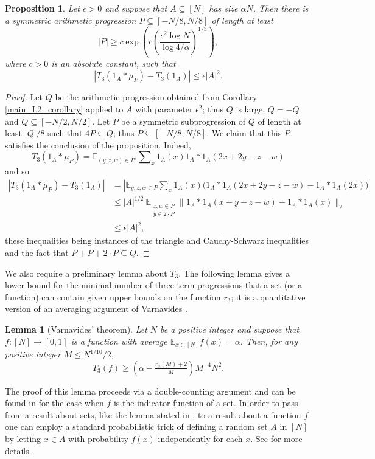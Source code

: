 \documentclass[12pt,a4paper,reqno]{amsart}
\numberwithin{equation}{section}
\theoremstyle{plain}
\newtheorem{proposition}[theorem]{Proposition}
\newtheorem{lemma}[theorem]{Lemma}
\theoremstyle{definition}
\renewcommand{\leq}{\leqslant}
\renewcommand{\geq}{\geqslant}
\renewcommand{\subset}{\subseteq}
\def\E{\mathbb{E}}
\DeclareMathOperator{\ssum}{\textstyle{\sum\nolimits}}
\providecommand{\norm}[1]{\lVert#1\rVert}
\begin{document}
\begin{proposition}\label{T3-approximation}
Let $\epsilon > 0$ and suppose that $A \subset [N]$ has size $\alpha N$. Then there is a symmetric arithmetic progression $P \subset [-N/8,N/8]$ of length at least 
\[ |P| \geq c \exp\left( c \left( \frac{\epsilon^2\log{N}}{\log{4/\alpha}} \right)^{1/3} \right), \]
where $c > 0$ is an absolute constant, such that
\[ | T_3(1_A * \mu_P) - T_3(1_A) | \leq \epsilon |A|^2. \]
\end{proposition}
\begin{proof}
Let $Q$ be the arithmetic progression obtained from Corollary \ref{main_L2_corollary} applied to $A$ with parameter $\epsilon^2$; thus $Q$ is large, $Q = -Q$ and $Q \subset [-N/2,N/2]$. Let $P$ be a symmetric subprogression of $Q$ of length at least $|Q|/8$ such that $4P \subset Q$; thus $P \subset [-N/8,N/8]$. We claim that this $P$ satisfies the conclusion of the proposition. Indeed,
\[ T_3(1_A*\mu_P) = \E_{(y,z,w) \in P^3} \ssum_x 1_A(x) 1_A*1_A(2x+2y-z-w) \]
and so 
\begin{align*}
| T_3(1_A*\mu_P) - T_3(1_A) | &= \left| \E_{y,z,w \in P} \ssum_x 1_A(x) \big( 1_A*1_A(2x+2y-z-w) - 1_A*1_A(2x) \big) \right| \\
&\leq |A|^{1/2}\ \E_{\substack{z,w \in P \\ y \in 2\cdot P}} \norm{1_A*1_A(x -y-z-w) - 1_A*1_A(x)}_2 \\
&\leq \epsilon |A|^2,
\end{align*}
these inequalities being instances of the triangle and Cauchy-Schwarz inequalities and the fact that $P+P+2\cdot P \subset Q$.
\end{proof}

We also require a preliminary lemma about $T_3$. The following lemma gives a lower bound for the minimal number of three-term progressions that a set (or a function) can contain given upper bounds on the function $r_3$; it is a quantitative version of an averaging argument of Varnavides \cite{varnavides}.

\begin{lemma}[Varnavides' theorem]\label{varnavides_thm}
Let $N$ be a positive integer and suppose that $f : [N] \to [0,1]$ is a function with average $\E_{x \in [N]} f(x) = \alpha$. Then, for any positive integer $M \leq N^{1/10}/2$,  
\[ T_3(f) \geq \left(\alpha - \tfrac{r_3(M)+2}{M}\right)M^{-4} N^2. \]
\end{lemma}

The proof of this lemma proceeds via a double-counting argument and can be found in \cite{croot-sisask:roth} for the case when $f$ is the indicator function of a set. In order to pass from a result about sets, like the lemma stated in \cite{croot-sisask:roth}, to a result about a function $f$ one can employ a standard probabilistic trick of defining a random set $A$ in $[N]$ by letting $x \in A$ with probability $f(x)$ independently for each $x$. See \cite[Exercise 10.1.7]{tao-vu} for more details.
\end{document}
